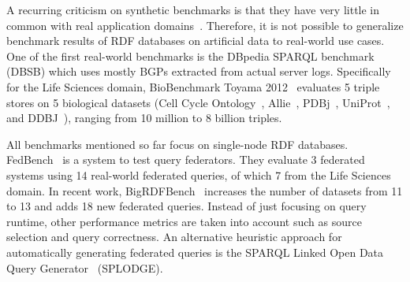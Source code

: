 \documentclass[twocolumn]{bmcart}%
\begin{document}
A recurring criticism on synthetic benchmarks is that they have very little in common with real application domains~\cite{DBLP:conf/sigmod/DuanKSU11}. Therefore, it is not possible to generalize benchmark results of RDF databases on artificial data to real-world use cases.
%
One of the first real-world benchmarks is the DBpedia SPARQL benchmark~\cite{morsey2011dbpedia} (DBSB) which uses mostly BGPs extracted from actual server logs.
Specifically for the Life Sciences domain, BioBenchmark Toyama 2012~\cite{wu2014biobenchmark} evaluates 5 triple stores on 5 biological datasets (Cell Cycle Ontology~\cite{antezana2009cell}, Allie~\cite{yamamoto2011allie}, PDBj~\cite{kinjo2011protein}, UniProt~\cite{uniprot2014uniprot}, and DDBJ~\cite{tateno2002dna}), ranging from 10 million to 8 billion triples.

All benchmarks mentioned so far focus on single-node RDF databases. FedBench~\cite{Schmidt2011} is a system to test query federators. They evaluate 3 federated systems using 14 real-world federated queries, of which 7 from the Life Sciences domain. In recent work, BigRDFBench~\cite{Saleem} increases the number of datasets from 11 to 13 and adds 18 new federated queries. Instead of just focusing on query runtime, other performance metrics are taken into account such as source selection and query correctness. An alternative heuristic approach for automatically generating federated queries is the SPARQL Linked Open Data Query Generator~\cite{gorlitz2012splodge} (SPLODGE).
\end{document}
